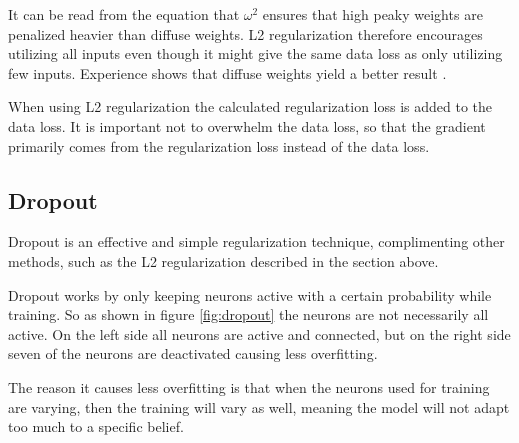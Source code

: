 It can be read from the equation that $\omega^2$ ensures that high peaky weights are penalized heavier than diffuse weights. L2 regularization therefore encourages utilizing all inputs even though it might give the same data loss as only utilizing few inputs. Experience shows that diffuse weights yield a better result \citep{LC_cs231n}.

When using L2 regularization the calculated regularization loss is added to the data loss. It is important not to overwhelm the data loss, so that the gradient primarily comes from the regularization loss instead of the data loss.



\subsection{Dropout}
Dropout is an effective and simple regularization technique, complimenting other methods, such as the L2 regularization described in the section above. 

Dropout works by only keeping neurons active with a certain probability while training. So as shown in figure \ref{fig:dropout} the neurons are not necessarily all active. On the left side all neurons are active and connected, but on the right side seven of the neurons are deactivated causing less overfitting.  


The reason it causes less overfitting is that when the neurons used for training are varying, then the training will vary as well, meaning the model will not adapt too much to a specific belief. 



